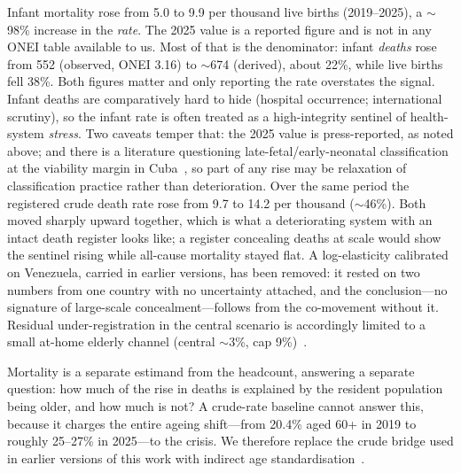 \documentclass[11pt,a4paper]{article}
\begin{document}
Infant mortality rose from 5.0 to 9.9 per thousand live births (2019--2025), a $\sim$98\% increase in the \emph{rate}. The 2025 value is a reported figure and is not in any ONEI table available to us.
Most of that is the denominator: infant \emph{deaths} rose from 552 (observed, ONEI 3.16) to $\sim$674 (derived), about 22\%, while live births fell 38\%.
Both figures matter and only reporting the rate overstates the signal.
Infant deaths are comparatively hard to hide (hospital occurrence; international scrutiny), so the infant rate is often treated as a high-integrity sentinel of health-system \emph{stress}. Two caveats temper that: the 2025 value is press-reported, as noted above; and there is a literature questioning late-fetal/early-neonatal classification at the viability margin in Cuba~\citep{berdine2018}, so part of any rise may be relaxation of classification practice rather than deterioration.
Over the same period the registered crude death rate rose from 9.7 to 14.2 per thousand ($\sim$46\%).
Both moved sharply upward together, which is what a deteriorating system with an intact death register looks like; a register concealing deaths at scale would show the sentinel rising while all-cause mortality stayed flat.
A log-elasticity calibrated on Venezuela, carried in earlier versions, has been removed: it rested on two numbers from one country with no uncertainty attached, and the conclusion---no signature of large-scale concealment---follows from the co-movement without it.
Residual under-registration in the central scenario is accordingly limited to a small at-home elderly channel (central $\sim$3\%, cap 9\%)~\citep{modeld}.

Mortality is a separate estimand from the headcount, answering a separate question: how much of the rise in deaths is explained by the resident population being older, and how much is not?
A crude-rate baseline cannot answer this, because it charges the entire ageing shift---from 20.4\% aged 60+ in 2019 to roughly 25--27\% in 2025---to the crisis.
We therefore replace the crude bridge used in earlier versions of this work with indirect age standardisation~\citep{preston2001}.
\end{document}
